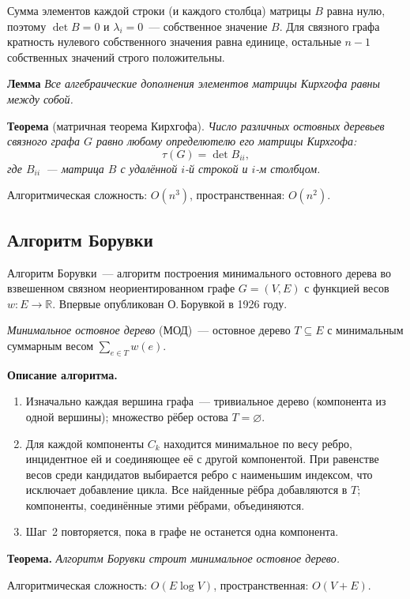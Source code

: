 Сумма элементов каждой строки (и каждого столбца) матрицы $B$ равна нулю,
поэтому $\det B = 0$ и $\lambda_i = 0$~--- собственное значение $B$. Для связного графа
кратность нулевого собственного значения равна единице, остальные
$n - 1$ собственных значений строго положительны.

\textbf{Лемма} \textit{Все алгебраические дополнения
элементов матрицы Кирхгофа равны между собой.}

\textbf{Теорема} (матричная теорема Кирхгофа). \textit{Число различных
остовных деревьев связного графа $G$ равно любому определютелю его матрицы
Кирхгофа:}
\[
    \tau(G) = \det B_{ii},
\]
\textit{где $B_{ii}$~--- матрица $B$ с удалённой $i$-й строкой и $i$-м
столбцом.}

Алгоритмическая сложность: $O(n^3)$, пространственная: $O(n^2)$.

\subsection{Алгоритм Борувки}

Алгоритм Борувки~--- алгоритм построения минимального остовного дерева
во взвешенном связном неориентированном графе $G = (V, E)$ с функцией
весов $w : E \to \mathbb{R}$. Впервые опубликован О.\,Борувкой в 1926 году.

\textit{Минимальное остовное дерево} (МОД)~--- остовное дерево
$T \subseteq E$ с минимальным суммарным весом $\sum_{e \in T} w(e)$.

\textbf{Описание алгоритма.}
\begin{enumerate}
    \item Изначально каждая вершина графа~--- тривиальное дерево
          (компонента из одной вершины); множество рёбер остова $T = \varnothing$.
    \item Для каждой компоненты $C_k$ находится минимальное по весу ребро,
          инцидентное ей и соединяющее её с другой компонентой.
          При равенстве весов среди кандидатов выбирается ребро
          с наименьшим индексом, что исключает добавление цикла.
          Все найденные рёбра добавляются в $T$;
          компоненты, соединённые этими рёбрами, объединяются.
    \item Шаг~2 повторяется, пока в графе не останется одна компонента.
\end{enumerate}

\textbf{Теорема.} \textit{Алгоритм Борувки строит минимальное остовное дерево.}

Алгоритмическая сложность: $O(E \log V)$, пространственная: $O(V + E)$.

